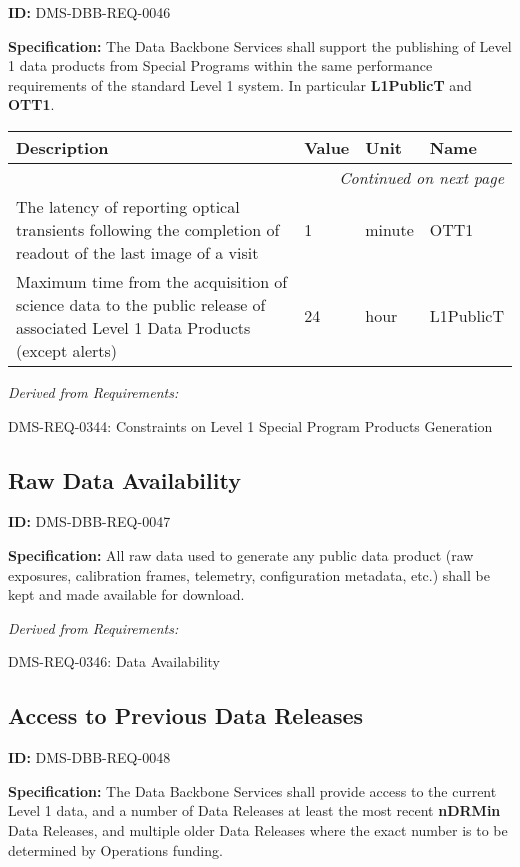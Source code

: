 \documentclass[SE,toc]{lsstdoc}
\makeatletter
\newcommand{\paramname}[1]{\hspace{0pt}#1}
\newcommand{\unitname}[1]{\hspace{0pt}#1}
\newenvironment{parameters}[0]{%
\setlength\LTleft{0pt}
\setlength\LTright{\fill}
\begin{small}
\begin{longtable}[]{|p{0.49\textwidth}|l|p{0.6in}|p{1.70in}@{}|}

\hline \textbf{Description} & \textbf{Value} & \textbf{Unit} & \textbf{Name} \\ \hline
\endhead

\hline \multicolumn{4}{r}{\emph{Continued on next page}} \\
\endfoot

\hline\hline
\endlastfoot
}{%
\hline
\end{longtable}
\end{small}
}
\makeatother
\begin{document}
\label{DMS-DBB-REQ-0046}
\textbf{ID:} DMS-DBB-REQ-0046

\textbf{Specification:}
The Data Backbone Services shall support the publishing of Level 1 data products from Special Programs within the same performance requirements of the standard Level 1 system. In particular \textbf{L1PublicT} and \textbf{OTT1}.

\begin{parameters}
The latency of reporting optical transients following the completion of readout of the last image of a visit
&
1
&
\unitname{%
minute
}
&
\paramname{%
OTT1
} \\\hline
Maximum time from the acquisition of science data to the public release of associated Level 1 Data Products (except alerts)
&
24
&
\unitname{%
hour
}
&
\paramname{%
L1PublicT
} \\\hline
\end{parameters}

\emph{Derived from Requirements:}

DMS-REQ-0344:
Constraints on Level 1 Special Program Products Generation \newline

\subsection{Raw Data Availability}

\label{DMS-DBB-REQ-0047}
\textbf{ID:} DMS-DBB-REQ-0047

\textbf{Specification:}
All raw data used to generate any public data product (raw exposures, calibration
frames, telemetry, configuration metadata, etc.) shall be kept and made available for
download.

\emph{Derived from Requirements:}

DMS-REQ-0346:
Data Availability \newline

\subsection{Access to Previous Data Releases}

\label{DMS-DBB-REQ-0048}
\textbf{ID:} DMS-DBB-REQ-0048

\textbf{Specification:}
The Data Backbone Services shall provide access to the current Level 1 data, and a number of Data Releases at least the most recent \textbf{nDRMin} Data Releases, and multiple older Data Releases where the exact number is to be determined by Operations funding.
\end{document}

